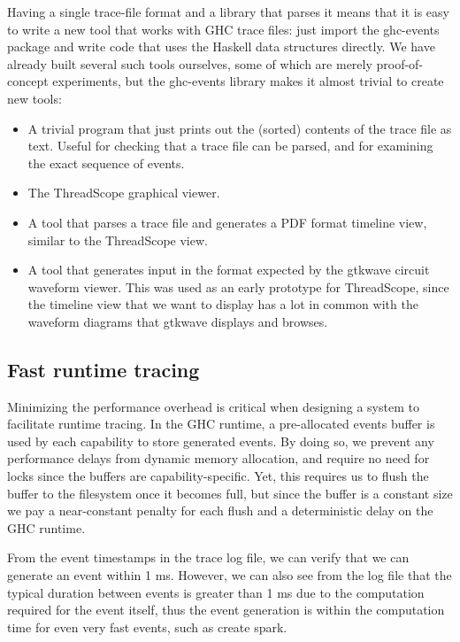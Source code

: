 \documentclass[twocolumn,9pt]{sigplanconf}
\newcommand{\codef}[1]{{\fontfamily{cmss}\small#1}}
\begin{document}
Having a single trace-file format and a library that parses it means
that it is easy to write a new tool that works with GHC trace files:
just import the \codef{ghc-events} package and write code that uses the
Haskell data structures directly.  We have already built several such
tools ourselves, some of which are merely proof-of-concept
experiments, but the \codef{ghc-events} library makes it almost trivial to
create new tools:

\begin{itemize}
\item A trivial program that just prints out the (sorted) contents of
  the trace file as text.  Useful for checking that a trace file can
  be parsed, and for examining the exact sequence of events.

\item The ThreadScope graphical viewer.

\item A tool that parses a trace file and generates a PDF format
  timeline view, similar to the ThreadScope view.

\item A tool that generates input in the format expected by the
  gtkwave circuit waveform viewer.  This was used as an early
  prototype for ThreadScope, since the timeline view that we want to
  display has a lot in common with the waveform diagrams that gtkwave
  displays and browses.
\end{itemize}

\subsection{Fast runtime tracing}
Minimizing the performance overhead is critical when designing a system
to facilitate runtime tracing.  In the GHC runtime, a pre-allocated events buffer is 
used by each capability to store generated events.
By doing so, we prevent any performance delays from dynamic 
memory allocation, and require no need for locks since the buffers are
capability-specific.  Yet, this requires us to flush the buffer
to the filesystem once it becomes full, but since the buffer is a
constant size we pay a near-constant penalty for each flush and a
deterministic delay on the GHC runtime.

From the event timestamps in the trace log file, we can verify that we can 
generate an event within 1 ms.  However, we can also see from the log file that
the typical duration between events is greater than 1 ms due to the computation 
required for the event itself, thus the event generation is within
the computation time for even very fast events, such as create spark.
\end{document}
